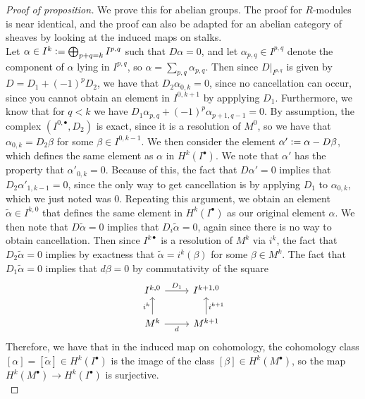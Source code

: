 \documentclass[psamsfonts, 12pt]{amsart}
\theoremstyle{definition}
\theoremstyle{remark}
\newcommand{\defeq}{\vcentcolon=}
\begin{document}
\begin{proof}[Proof of proposition]
We prove this for abelian groups. The proof for $R$-modules is near identical,
and the proof can also be adapted for an abelian category of sheaves by looking
at the induced maps on stalks. \\

Let $\alpha \in I^k \defeq \bigoplus_{p+q=k}I^{p,q}$ such that $D\alpha = 0$, and
let $\alpha_{p,q} \in I^{p,q}$ denote the component of $\alpha$ lying in $I^{p,q}$,
so $\alpha = \sum_{p,q}\alpha_{p,q}$. Then since $D\vert_{I^{p,q}}$ is given
by $D = D_1 + (-1)^pD_2$, we have that $D_2\alpha_{0,k} = 0$, since no cancellation
can occur, since you cannot obtain an element in $I^{0,k+1}$ by appplying $D_1$.
Furthermore, we know that for $q < k$ we have
$D_1\alpha_{p,q} + (-1)^p\alpha_{p+1,q-1} = 0$. By assumption, the complex
$(I^{0,\bullet},D_2)$ is exact, since it is a resolution of $M^0$, so we have that
$\alpha_{0,k} = D_2\beta$ for some $\beta \in I^{0,k-1}$. We then consider the
element $\alpha' \defeq \alpha - D\beta$, which defines the same element
as $\alpha$ in $H^k(I^\bullet)$. We note that $\alpha'$ has the property that
$\alpha'_{0,k} = 0$. Because of this, the fact that $D\alpha' = 0$ implies
that $D_2\alpha'_{1,k-1} = 0$, since the only way to get cancellation is
by applying $D_1$ to $\alpha_{0,k}$, which we just noted was $0$. Repeating
this argument, we obtain an element $\tilde{\alpha} \in I^{k,0}$ that defines
the same element in $H^k(I^\bullet)$ as our original element $\alpha$. We
then note that $D\tilde{\alpha} = 0$ implies that $D_i\tilde{\alpha} = 0$,
again since there is no way to obtain cancellation. Then since
$I^{k\bullet}$ is a resolution of $M^k$ via $i^k$, the fact that
$D_2\tilde{\alpha} = 0$ implies by exactness that  $\tilde{\alpha} = i^k(\beta)$
for some $\beta \in M^k$. The fact that $D_1\tilde{\alpha} = 0$ implies that
$d\beta = 0$ by commutativity of the square
\[\begin{tikzcd}
I^{k,0} \ar[r, "D_1"] & I^{k+1,0} \\
M^k \ar[u, "i^k"]\ar[r,"d"'] & M^{k+1} \ar[u, "i^{k+1}"']
\end{tikzcd}\]
Therefore, we have that in the induced map on cohomology, the cohomology class
$[\alpha] = [\tilde{\alpha}] \in H^k(I^\bullet)$ is the image of the class
$[\beta] \in H^k(M^\bullet)$, so the map $H^k(M^\bullet) \to H^k(I^\bullet)$ is
surjective. \\


\end{proof}
\end{document}
